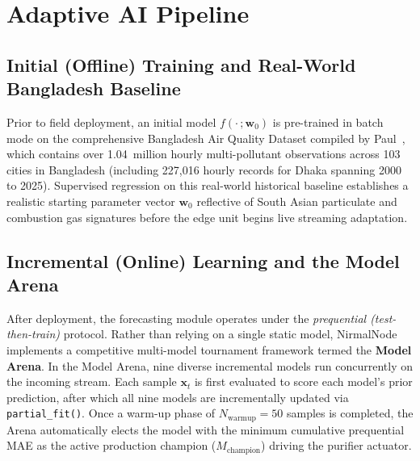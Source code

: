 \FloatBarrier

\section{Adaptive AI Pipeline}
\label{sec:meth-ai-pipeline}

\subsection{Initial (Offline) Training and Real-World Bangladesh Baseline}
Prior to field deployment, an initial model $f(\cdot\,;\mathbf{w}_0)$ is pre-trained in batch mode on the comprehensive Bangladesh Air Quality Dataset compiled by Paul~\cite{paul2026bangladesh}, which contains over 1.04~million hourly multi-pollutant observations across 103 cities in Bangladesh (including 227,016 hourly records for Dhaka spanning 2000 to 2025). Supervised regression on this real-world historical baseline establishes a realistic starting parameter vector $\mathbf{w}_0$ reflective of South Asian particulate and combustion gas signatures before the edge unit begins live streaming adaptation.

\subsection{Incremental (Online) Learning and the Model Arena}
After deployment, the forecasting module operates under the \emph{prequential (test-then-train)} protocol. Rather than relying on a single static model, NirmalNode implements a competitive multi-model tournament framework termed the \textbf{Model Arena}. In the Model Arena, nine diverse incremental models run concurrently on the incoming stream. Each sample $\mathbf{x}_t$ is first evaluated to score each model's prior prediction, after which all nine models are incrementally updated via \texttt{partial\_fit()}. Once a warm-up phase of $N_{\text{warmup}} = 50$ samples is completed, the Arena automatically elects the model with the minimum cumulative prequential MAE as the active production champion ($M_{\text{champion}}$) driving the purifier actuator.


